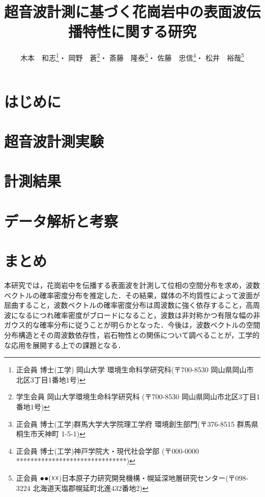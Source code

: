 \documentclass{jsce}
\title{
	超音波計測に基づく花崗岩中の表面波伝播特性に関する研究
}%
\author{木本　和志\thanks{正会員 博士(工学) 岡山大学 環境生命科学研究科(〒700-8530 岡山県岡山市北区3丁目1番地1号)\email{kimoto@cc.okayama-u.ac.jp}}・
岡野　蒼\thanks{学生会員 岡山大学環境生命科学研究科 (〒700-8530 岡山県岡山市北区3丁目1番地1号)}・
斎藤　隆泰\thanks{正会員 博士(工学)群馬大学大学院理工学府 環境創生部門(〒376-8515 群馬県桐生市天神町 1-5-1)}・
佐藤　忠信\thanks{正会員 博士(工学)神戸学院大・現代社会学部 (〒000-0000 *******************************)}・
松井　裕哉\thanks{正会員 ●●(☓☓)日本原子力研究開発機構・幌延深地層研究センター(〒098-3224 北海道天塩郡幌延町北進432番地2)}
}
\begin{document}
\maketitle
\section{はじめに}
	
\section{超音波計測実験}
	
\section{計測結果}
	
\section{データ解析と考察}
%	
\section{まとめ}
本研究では，花崗岩中を伝播する表面波を計測して位相の空間分布を求め，波数ベクトルの確率密度分布を推定した．その結果，媒体の不均質性によって波面が屈曲すること，波数ベクトルの確率密度分布は周波数に強く依存すること，高周波になるにつれ確率密度がブロードになること，波数は非対称かつ有限な幅の非ガウス的な確率分布に従うことが明らかとなった．今後は，波数ベクトルの空間分布構造とその周波数依存性，岩石物性との関係について調べることが，工学的な応用を展開する上での課題となる．
\end{document}
